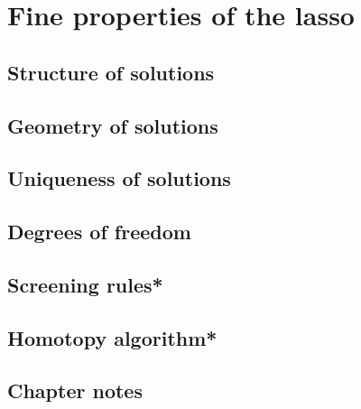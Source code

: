 \chapter{Fine properties of the lasso}
\label{chap:lasso}

\section{Structure of solutions}
\label{sec:lasso_structure}


\section{Geometry of solutions}


\section{Uniqueness of solutions}



\section{Degrees of freedom}

\section{Screening rules*}

\section{Homotopy algorithm*}

\SkipTocEntry\section*{Chapter notes}


